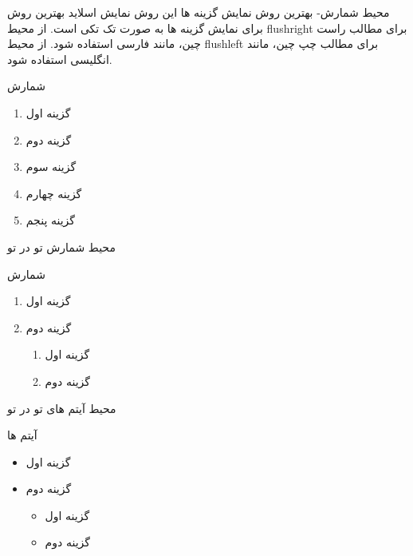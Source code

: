 \documentclass[xcolor=svgnames,10pt]{beamer}
\begin{document}
\begin{frame}[t]{محیط شمارش- بهترین روش نمایش گزینه ها}
این روش نمایش اسلاید بهترین روش برای نمایش گزینه ها به صورت تک تکی است.
از محیط flushright برای مطالب راست چین، مانند فارسی استفاده شود.
از محیط flushleft برای مطالب چپ چین، مانند انگلیسی استفاده شود.
\pause
\begin{block}{شمارش}
    \begin{enumerate}[<+->]
        \item \begin{flushright}
           گزینه اول  
        \end{flushright}
        \item \begin{flushright}
           گزینه دوم  
        \end{flushright}
        \item \begin{flushright}
           گزینه سوم  
        \end{flushright} 
        \item \begin{flushright}
           گزینه چهارم  
        \end{flushright}
        \item \begin{flushright}
           گزینه پنجم
        \end{flushright} 
    \end{enumerate}   
\end{block}	
\end{frame}
\begin{frame}[t]{محیط شمارش تو در تو}
\begin{block}{شمارش}
    \begin{enumerate}
        \item گزینه اول
        \item گزینه دوم
        \begin{enumerate}
            \item گزینه اول
            \item گزینه دوم
        \end{enumerate} 
    \end{enumerate}   
\end{block}	
\end{frame}
\begin{frame}[t]{محیط آیتم های تو در تو}
\begin{block}{آیتم ها}
    \begin{itemize}
        \item گزینه اول
        \item گزینه دوم
        \begin{itemize}
            \item گزینه اول
            \item گزینه دوم
        \end{itemize} 
    \end{itemize}   
\end{block}	
\end{frame}
\end{document}
